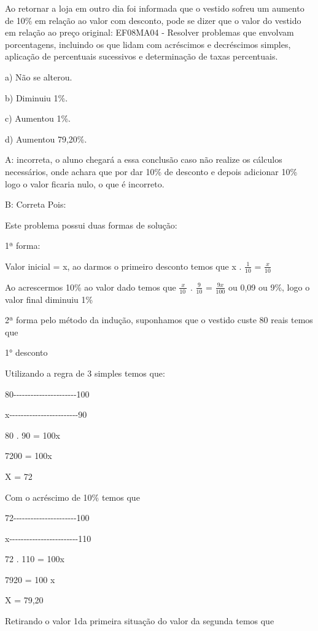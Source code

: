 {Ao retornar a loja em outro dia foi informada que o vestido sofreu um
aumento de 10\% em relação ao valor com desconto, pode se dizer que o
valor do vestido em relação ao preço original: EF08MA04 - Resolver
problemas que envolvam porcentagens, incluindo os que lidam com
acréscimos e decréscimos simples, aplicação de percentuais sucessivos e
determinação de taxas percentuais.

a) Não se alterou.

b) Diminuiu 1\%.

c) Aumentou 1\%.

d) Aumentou 79,20\%.

A: incorreta, o aluno chegará a essa conclusão caso não realize os
cálculos necessários, onde achara que por dar 10\% de desconto e depois
adicionar 10\% logo o valor ficaria nulo, o que é incorreto.

B: Correta Pois:

Este problema possui duas formas de solução:

1ª forma:

Valor inicial = x, ao darmos o primeiro desconto temos que x .
\(\frac{1}{10}\) = \(\frac{x}{10}\)

Ao acrescermos 10\% ao valor dado temos que \(\frac{x}{10\ }\) .
\(\frac{9}{10}\) = \(\frac{9x}{100}\) ou 0,09 ou 9\%, logo o valor final
diminuiu 1\%

2ª forma pelo método da indução, suponhamos que o vestido custe 80 reais
temos que

1° desconto

Utilizando a regra de 3 simples temos que:

80-\/-\/-\/-\/-\/-\/-\/-\/-\/-\/-\/-\/-\/-\/-\/-\/-\/-\/-\/-\/-\/-100

x-\/-\/-\/-\/-\/-\/-\/-\/-\/-\/-\/-\/-\/-\/-\/-\/-\/-\/-\/-\/-\/-\/-\/-90

80 . 90 = 100x

7200 = 100x

X = 72

Com o acréscimo de 10\% temos que

72-\/-\/-\/-\/-\/-\/-\/-\/-\/-\/-\/-\/-\/-\/-\/-\/-\/-\/-\/-\/-\/-100

x-\/-\/-\/-\/-\/-\/-\/-\/-\/-\/-\/-\/-\/-\/-\/-\/-\/-\/-\/-\/-\/-\/-\/-110

72 . 110 = 100x

7920 = 100 x

X = 79,20

Retirando o valor 1da primeira situação do valor da segunda temos que

}

